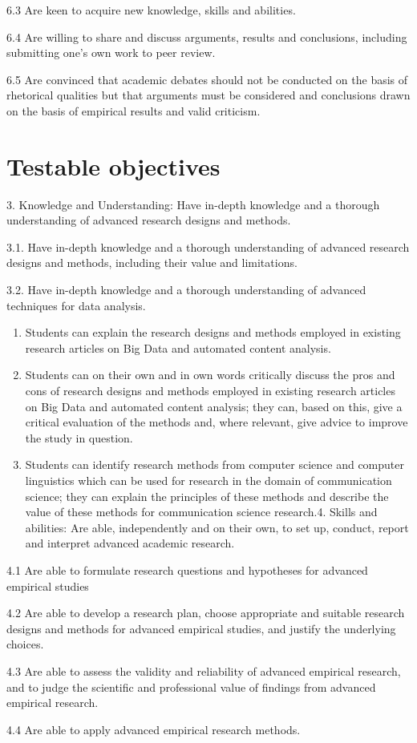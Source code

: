 \documentclass[a4paper,12pt]{report}
\begin{document}
6.3 	Are keen to acquire new knowledge, skills and abilities. 


6.4 	Are willing to share and discuss arguments, results and conclusions, including submitting one's own work to peer review. 


6.5 	Are convinced that academic debates should not be conducted on the basis of rhetorical qualities but that arguments must be considered and conclusions drawn on the basis of empirical results and valid criticism.





\chapter{Testable objectives}

{\footnotesize{
3. Knowledge and Understanding: Have in-depth knowledge and a thorough understanding of advanced research designs and methods. 


3.1. Have in-depth knowledge and a thorough understanding of advanced research designs and methods, including their value and limitations.


3.2.	Have in-depth knowledge and a thorough understanding of advanced techniques for data analysis.

}}

\begin{enumerate}[A]
\item Students can explain the research designs and methods employed in existing research articles on Big Data and automated content analysis.
\item Students can on their own and in own words critically discuss the pros and cons of research designs and methods employed in existing research articles on Big Data and automated content analysis; they can, based on this, give a critical evaluation of the methods and, where relevant, give advice to improve the study in question.
\item Students can identify research methods from computer science and computer linguistics which can be used for research in the domain of communication science; they can explain the principles of these methods and describe the value of these methods for communication science research.4. Skills and abilities: Are able, independently and on their own, to set up, conduct, report and interpret advanced academic research.
\end{enumerate}

{\footnotesize{
4.1	Are able to formulate research questions and hypotheses for advanced empirical studies


4.2	Are able to develop a research plan, choose appropriate and suitable research designs and methods for advanced empirical studies, and justify the underlying choices. 


4.3	Are able to assess the validity and reliability of advanced empirical research, and to judge the scientific and professional value of findings from advanced empirical research.


4.4	Are able to apply advanced empirical research methods.

 }}
\end{document}

